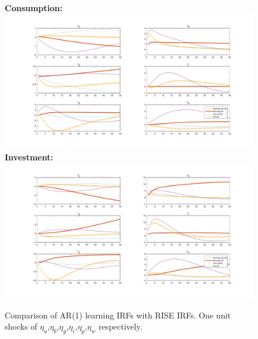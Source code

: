 \documentclass[12pt,reqno]{article}
\numberwithin{equation}{section}
\begin{document}
\begin{figure}[H]
\caption{Comparison of AR(1) learning IRFs with RISE IRFs. One unit shocks of $\eta_a$,$\eta_b$,$\eta_g$,$\eta_i$,$\eta_p$,$\eta_w$ respectively.}
\textbf{Consumption:}\\
\includegraphics[scale=0.5]{AR1_impresp_cons_riseComp.pdf}
\textbf{Investment:}\\
\includegraphics[scale=0.5]{AR1_impresp_inv_riseComp.pdf}

\end{figure}
\end{document}
